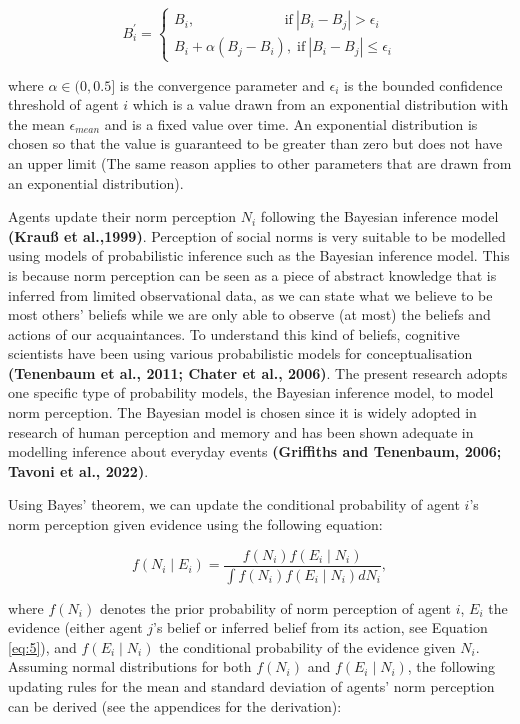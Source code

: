 \documentclass[
  11pt,
]{article}
\begin{document}
\begin{equation}
    B_i^{\prime} = \begin{cases}
        B_i, \;\;\;\;\;\;\;\;\;\;\;\;\;\;\;\;\;\;\;\;\;\;\; \text{if} \: |B_i - B_j| > \epsilon_i \\
        B_i + \alpha (B_j - B_i), \; \text{if} \: |B_i - B_j| \le \epsilon_i
    \end{cases}
\end{equation}

where \(\alpha \in (0,0.5]\) is the convergence parameter and
\(\epsilon_i\) is the bounded confidence threshold of agent \(i\) which
is a value drawn from an exponential distribution with the mean
\(\epsilon_{mean}\) and is a fixed value over time. An exponential
distribution is chosen so that the value is guaranteed to be greater
than zero but does not have an upper limit (The same reason applies to
other parameters that are drawn from an exponential distribution).

Agents update their norm perception \(N_i\) following the Bayesian
inference model \textbf{(Krauß et al.,1999)}. Perception of social norms
is very suitable to be modelled using models of probabilistic inference
such as the Bayesian inference model. This is because norm perception
can be seen as a piece of abstract knowledge that is inferred from
limited observational data, as we can state what we believe to be most
others' beliefs while we are only able to observe (at most) the beliefs
and actions of our acquaintances. To understand this kind of beliefs,
cognitive scientists have been using various probabilistic models for
conceptualisation \textbf{(Tenenbaum et al., 2011; Chater et al.,
2006)}. The present research adopts one specific type of probability
models, the Bayesian inference model, to model norm perception. The
Bayesian model is chosen since it is widely adopted in research of human
perception and memory and has been shown adequate in modelling inference
about everyday events \textbf{(Griffiths and Tenenbaum, 2006; Tavoni et
al., 2022)}.

Using Bayes' theorem, we can update the conditional probability of agent
\(i\)'s norm perception given evidence using the following equation:

\begin{equation}
\label{eq:2}
f(N_i \mid E_i) = \frac{f(N_i) f(E_i \mid N_i)}{\int f(N_i) f(E_i \mid N_i) dN_i},
\end{equation}

where \(f(N_i)\) denotes the prior probability of norm perception of
agent \(i\), \(E_i\) the evidence (either agent \(j\)'s belief or
inferred belief from its action, see Equation \ref{eq:5}), and
\(f(E_i \mid N_i)\) the conditional probability of the evidence given
\(N_i\). Assuming normal distributions for both \(f(N_i)\) and
\(f(E_i \mid N_i)\), the following updating rules for the mean and
standard deviation of agents' norm perception can be derived (see the
appendices for the derivation):
\end{document}
